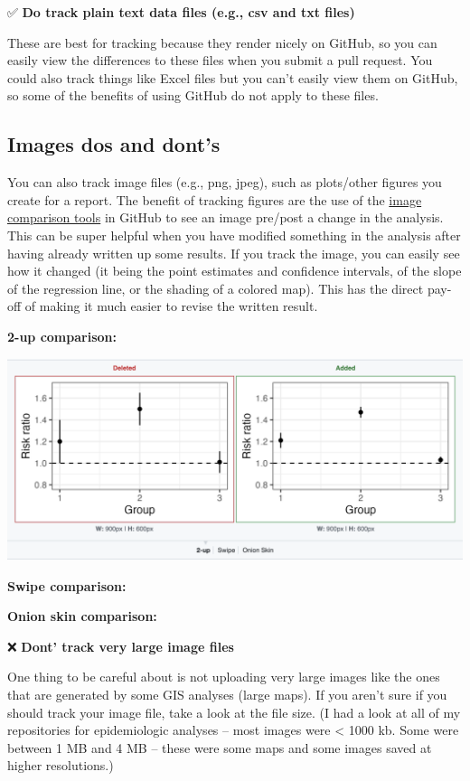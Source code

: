 \documentclass[
]{book}
\begin{document}
✅ \textbf{Do track plain text data files (e.g., csv and txt files) }

These are best for tracking because they render nicely on GitHub, so you can
easily view the differences to these files when you submit a pull request. You
could also track things like Excel files but you can't easily view them on
GitHub, so some of the benefits of using GitHub do not apply to these files.

\subsection{Images dos and dont's}\label{images-dos-and-donts}

You can also track image files (e.g., png, jpeg), such as plots/other figures
you create for a report. The benefit of tracking figures are the use of the
\href{https://github.blog/2011-03-21-behold-image-view-modes/}{image comparison tools}
in GitHub to see an image pre/post a change in the
analysis. This can be super helpful when you have modified something in the
analysis after having already written up some results. If you track the image,
you can easily see how it changed (it being the point estimates and confidence
intervals, of the slope of the regression line, or the shading of a colored map).
This has the direct pay-off of making it much easier to revise the written
result.

\textbf{2-up comparison:}

\includegraphics[width=1\linewidth]{./figures/2-up-example}

\textbf{Swipe comparison:}

\textbf{Onion skin comparison:}

❌ \textbf{Dont' track very large image files}

One thing to be careful about is not uploading very large images like the
ones that are generated by some GIS analyses (large maps). If you aren't sure if
you should track your image file, take a look at the file size. (I had a look at
all of my repositories for epidemiologic analyses -- most images were \textless{} 1000 kb.
Some were between 1 MB and 4 MB -- these were some maps and some images saved at
higher resolutions.)
\end{document}

